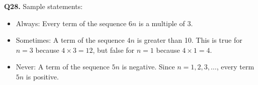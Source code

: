\documentclass[11pt,a4paper]{article}
\begin{document}
\textbf{Q28.} Sample statements:
\begin{itemize}
\item Always: Every term of the sequence \(6n\) is a multiple of 3.
\item Sometimes: A term of the sequence \(4n\) is greater than 10. This is true for \(n=3\) because \(4\times3=12\), but false for \(n=1\) because \(4\times1=4\).
\item Never: A term of the sequence \(5n\) is negative. Since \(n=1,2,3,\ldots\), every term \(5n\) is positive.
\end{itemize}
\end{document}
